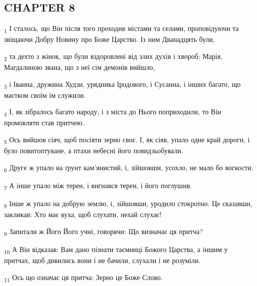\subsection{CHAPTER 8}
\begin{tcolorbox}
\textsubscript{1} І сталось, що Він після того проходив містами та селами, проповідуючи та звіщаючи Добру Новину про Боже Царство. Із ним Дванадцять були,
\end{tcolorbox}
\begin{tcolorbox}
\textsubscript{2} та дехто з жінок, що були вздоровлені від злих духів і хвороб: Марія, Магдалиною звана, що з неї сім демонів вийшло,
\end{tcolorbox}
\begin{tcolorbox}
\textsubscript{3} і Іванна, дружина Худзи, урядника Іродового, і Сусанна, і інших багато, що маєтком своїм їм служили.
\end{tcolorbox}
\begin{tcolorbox}
\textsubscript{4} І, як зібралось багато народу, і з міста до Нього поприходили, то Він промовляти став притчею.
\end{tcolorbox}
\begin{tcolorbox}
\textsubscript{5} Ось вийшов сіяч, щоб посіяти зерно своє. І, як сіяв, упало одне край дороги, і було повитоптуване, а птахи небесні його повидзьобували.
\end{tcolorbox}
\begin{tcolorbox}
\textsubscript{6} Друге ж упало на ґрунт кам'янистий, і, зійшовши, усохло, не мало бо вогкости.
\end{tcolorbox}
\begin{tcolorbox}
\textsubscript{7} А інше упало між терен, і вигнався терен, і його поглушив.
\end{tcolorbox}
\begin{tcolorbox}
\textsubscript{8} Інше ж упало на добрую землю, і, зійшовши, уродило стокротно. Це сказавши, закликав: Хто має вуха, щоб слухати, нехай слухає!
\end{tcolorbox}
\begin{tcolorbox}
\textsubscript{9} Запитали ж Його Його учні, говорячи: Що визначає ця притча?
\end{tcolorbox}
\begin{tcolorbox}
\textsubscript{10} А Він відказав: Вам дано пізнати таємниці Божого Царства, а іншим у притчах, щоб дивились вони і не бачили, слухали і не розуміли.
\end{tcolorbox}
\begin{tcolorbox}
\textsubscript{11} Ось що означає ця притча: Зерно це Боже Слово.
\end{tcolorbox}
